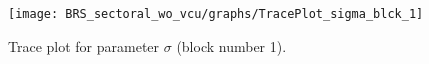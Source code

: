 \begin{figure}[H]
\centering
  \texttt{[image: BRS\_sectoral\_wo\_vcu/graphs/TracePlot\_sigma\_blck\_1]}\\
    \caption{Trace plot for parameter ${\sigma}$ (block number 1).}
\end{figure}
